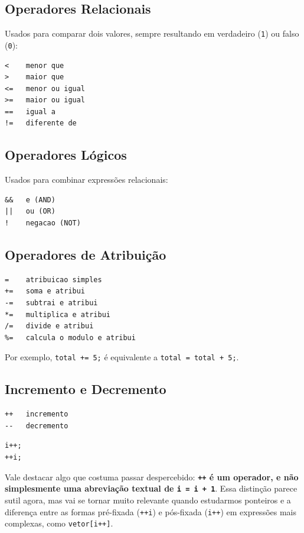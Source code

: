 \documentclass[12pt,a4paper,oneside]{extreport}
\begin{document}
\subsection{Operadores Relacionais}
Usados para comparar dois valores, sempre resultando em verdadeiro (\texttt{1}) ou falso (\texttt{0}):

\begin{lstlisting}
<    menor que
>    maior que
<=   menor ou igual
>=   maior ou igual
==   igual a
!=   diferente de
\end{lstlisting}

\subsection{Operadores Lógicos}
Usados para combinar expressões relacionais:

\begin{lstlisting}
&&   e (AND)
||   ou (OR)
!    negacao (NOT)
\end{lstlisting}

\subsection{Operadores de Atribuição}
\begin{lstlisting}
=    atribuicao simples
+=   soma e atribui
-=   subtrai e atribui
*=   multiplica e atribui
/=   divide e atribui
%=   calcula o modulo e atribui
\end{lstlisting}

Por exemplo, \texttt{total += 5;} é equivalente a \texttt{total = total + 5;}.

\subsection{Incremento e Decremento}
\begin{lstlisting}
++   incremento
--   decremento
\end{lstlisting}

\begin{lstlisting}
i++;
++i;
\end{lstlisting}

Vale destacar algo que costuma passar despercebido: \textbf{\texttt{++} é um operador, e não simplesmente uma abreviação textual de \texttt{i = i + 1}}. Essa distinção parece sutil agora, mas vai se tornar muito relevante quando estudarmos ponteiros e a diferença entre as formas pré-fixada (\texttt{++i}) e pós-fixada (\texttt{i++}) em expressões mais complexas, como \texttt{vetor[i++]}.
\end{document}
